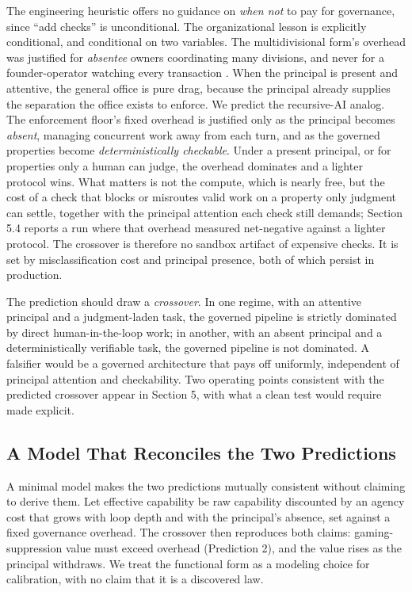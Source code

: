 \documentclass[11pt]{article}
\begin{document}
The engineering heuristic offers no guidance on \emph{when not} to pay for governance, since ``add checks'' is unconditional. The organizational lesson is explicitly conditional, and conditional on two variables. The multidivisional form's overhead was justified for \emph{absentee} owners coordinating many divisions, and never for a founder-operator watching every transaction \citep{berle1932,jensen1976,chandler1962}. When the principal is present and attentive, the general office is pure drag, because the principal already supplies the separation the office exists to enforce. We predict the recursive-AI analog. The enforcement floor's fixed overhead is justified only as the principal becomes \emph{absent}, managing concurrent work away from each turn, and as the governed properties become \emph{deterministically checkable}. Under a present principal, or for properties only a human can judge, the overhead dominates and a lighter protocol wins. What matters is not the compute, which is nearly free, but the cost of a check that blocks or misroutes valid work on a property only judgment can settle, together with the principal attention each check still demands; Section 5.4 reports a run where that overhead measured net-negative against a lighter protocol. The crossover is therefore no sandbox artifact of expensive checks. It is set by misclassification cost and principal presence, both of which persist in production.

The prediction should draw a \emph{crossover}. In one regime, with an attentive principal and a judgment-laden task, the governed pipeline is strictly dominated by direct human-in-the-loop work; in another, with an absent principal and a deterministically verifiable task, the governed pipeline is not dominated. A falsifier would be a governed architecture that pays off uniformly, independent of principal attention and checkability. Two operating points consistent with the predicted crossover appear in Section 5, with what a clean test would require made explicit.

\subsection{A Model That Reconciles the Two Predictions}

A minimal model makes the two predictions mutually consistent without claiming to derive them. Let effective capability be raw capability discounted by an agency cost that grows with loop depth and with the principal's absence, set against a fixed governance overhead. The crossover then reproduces both claims: gaming-suppression value must exceed overhead (Prediction 2), and the value rises as the principal withdraws. We treat the functional form as a modeling choice for calibration, with no claim that it is a discovered law.
\end{document}
